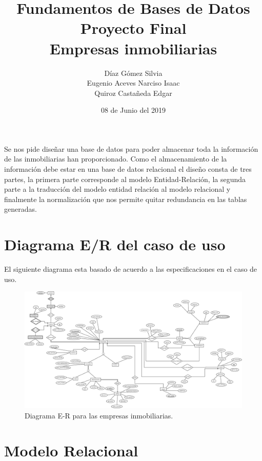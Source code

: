 \documentclass[10pt]{article}
\begin{document}
	\title{Fundamentos de Bases de Datos \\
		Proyecto Final\\ Empresas inmobiliarias
	} 
	\author{Díaz Gómez Silvia \\
		Eugenio Aceves Narciso Isaac \\
		Quiroz Castañeda Edgar}
	\date{08 de Junio del 2019}
	\maketitle
	
	Se nos pide diseñar una base de datos para poder almacenar toda la información de  las inmobiliarias han proporcionado. Como el almacenamiento de la información debe estar en una base de datos relacional el diseño consta de tres partes, la primera parte corresponde al modelo Entidad-Relación, la segunda parte a la traducción del modelo entidad relación al modelo relacional y finalmente la normalización que nos permite quitar redundancia en las tablas generadas. 
	
	\section{Diagrama E/R del caso de uso}
	
	El siguiente diagrama esta basado de acuerdo a las especificaciones en el caso de uso.
	
	\begin{center}
		\begin{figure}[H]
			\centering
			\includegraphics[width=1 \textwidth]{modeloER.jpeg}
			\caption{Diagrama E-R para las empresas inmobiliarias.}
			\label{ER}
		\end{figure}
	\end{center}
    \section{Modelo Relacional}
    
\end{document}
